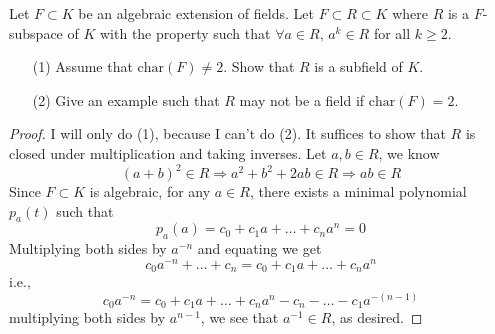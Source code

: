 \documentclass[openany]{book}
\begin{document}
\begin{prob}
    Let \(F\subset K\) be an algebraic extension of fields. Let \(F\subset R\subset K\) where \(R\) is a \(F\)-subspace of \(K\) with the property such that \(\forall a\in R\), \(a^{k}\in R\) for all \(k\geq 2\).
    \begin{itemize}
        \item[(1)] Assume that \(\text{char}(F)\neq 2\). Show that \(R\) is a subfield of \(K\).
        \item[(2)] Give an example such that \(R\) may not be a field if \(\text{char}(F)=2\).
    \end{itemize}
\end{prob}
\begin{proof}
    I will only do (1), because I can't do (2). It suffices to show that $R$ is closed under multiplication and taking inverses. Let $a,b\in R$, we know 
    \begin{equation*}
        (a+b)^2\in R\Rightarrow a^2+b^2+2ab\in R\Rightarrow ab\in R
    \end{equation*}
    Since $F\subset K$ is algebraic, for any $a\in R$, there exists a minimal polynomial $p_a(t)$ such that 
    \begin{equation*}
        p_a(a)=c_0+c_1a+\dots+c_na^n=0
    \end{equation*}
    Multiplying both sides by $a^{-n}$ and equating we get 
    \begin{equation*}
        c_0a^{-n}+\dots+c_n=c_0+c_1a+\dots+c_na^n
    \end{equation*} 
    i.e., 
    \begin{equation*}
        c_0a^{-n}=c_0+c_1a+\dots+c_na^n-c_n-\dots-c_1a^{-(n-1)}
    \end{equation*}
    multiplying both sides by $a^{n-1}$, we see that $a^{-1}\in R$, as desired.
\end{proof}
\end{document}
